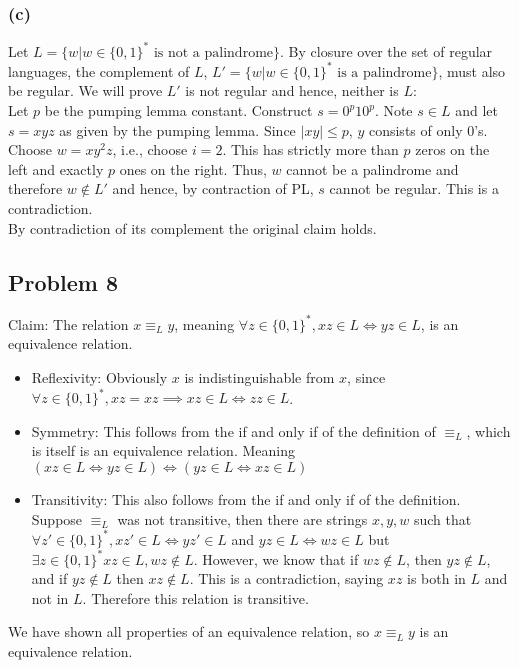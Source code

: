 \documentclass[english]{article}
\begin{document}
\subsubsection*{(c)}
Let $L = \{w|w \in \{0,1\}^* \text{ is not a palindrome}\}$. By closure over the set of regular languages, the complement of $L$, $L' = \{w|w \in \{0,1\}^* \text{ is a palindrome}\}$, must also be regular. We will prove $L'$ is not regular and hence, neither is $L$:\\
Let $p$ be the pumping lemma constant. Construct $s = 0^p 1 0^p$.
Note $s \in L$ and let $s = xyz$ as given by the pumping lemma.
Since $|xy| \leq p$, $y$ consists of only $0$'s. Choose $w = xy^2 z$, i.e., choose $i=2$. This has strictly more than $p$ zeros on the left and exactly $p$ ones on the right. Thus, $w$ cannot be a palindrome and therefore $w \notin L'$ and hence, by contraction of PL, $s$ cannot be regular. This is a contradiction.\\
By contradiction of its complement the original claim holds.

\subsection*{Problem 8}
Claim: The relation $x \equiv_L y$, meaning $\forall z \in \{0,1\}^*, xz \in L \iff yz \in L$, is an equivalence relation.
\begin{itemize}
\item Reflexivity: Obviously $x$ is indistinguishable from $x$, since $\forall z \in \{0,1\}^*, xz = xz \implies xz \in L \iff zz \in L$.
\item Symmetry: This follows from the if and only if of the definition of $\equiv_L$, which is itself is an equivalence relation. Meaning $(xz \in L \iff yz \in L) \iff (yz \in L \iff xz \in L)$
\item Transitivity: This also follows from the if and only if of the definition. Suppose $\equiv_L$ was not transitive, then there are strings $x,y,w$ such that $\forall z' \in \{0,1\}^*, xz' \in L \iff yz' \in L$ and $yz \in L \iff wz \in L$ but $\exists z \in \{0,1\}^* xz \in L, wz \notin L$. However, we know that if $wz \notin L$, then $yz \notin L$, and if $yz \notin L$ then $xz \notin L$. This is a contradiction, saying $xz$ is both in $L$ and not in $L$. Therefore this relation is transitive.
\end{itemize}

We have shown all properties of an equivalence relation, so $x \equiv_L y$ is an equivalence relation.
\end{document}
